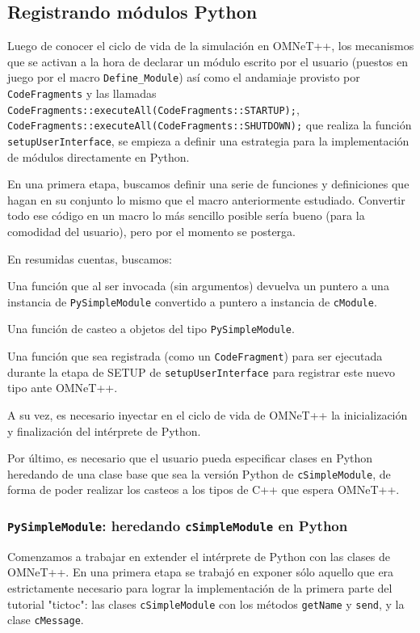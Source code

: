 \documentclass[]{article}
\begin{document}
\subsection{Registrando módulos Python}

Luego de conocer el ciclo de vida de la simulación en OMNeT++, los mecanismos
que se activan a la hora de declarar un módulo escrito por el usuario (puestos
en juego por el macro \verb!Define_Module!) así como el andamiaje provisto por
\verb!CodeFragments! y las llamadas
\verb!CodeFragments::executeAll(CodeFragments::STARTUP);!,
\verb!CodeFragments::executeAll(CodeFragments::SHUTDOWN);!  que realiza la
función \verb!setupUserInterface!, se empieza a definir una estrategia para la
implementación de módulos directamente en Python.

En una primera etapa, buscamos definir una serie de funciones y definiciones
que hagan en su conjunto lo mismo que el macro anteriormente estudiado.
Convertir todo ese código en un macro lo más sencillo posible sería bueno (para
la comodidad del usuario), pero por el momento se posterga.

En resumidas cuentas, buscamos:

Una función que al ser invocada (sin argumentos) devuelva un puntero a una
instancia de \verb!PySimpleModule! convertido a puntero a instancia de
\verb!cModule!.

Una función de casteo a objetos del tipo \verb!PySimpleModule!.

Una función que sea registrada (como un \verb!CodeFragment!) para ser ejecutada
durante la etapa de SETUP de \verb!setupUserInterface! para registrar este
nuevo tipo ante OMNeT++. 

A su vez, es necesario inyectar en el ciclo de vida de OMNeT++ la
inicialización y finalización del intérprete de Python.

Por último, es necesario que el usuario pueda especificar clases en Python
heredando de una clase base que sea la versión Python de \verb!cSimpleModule!,
de forma de poder realizar los casteos a los tipos de C++ que espera OMNeT++.

\subsubsection{\texttt{PySimpleModule}: heredando \texttt{cSimpleModule} en Python}

Comenzamos a trabajar en extender el intérprete de Python con las clases de
OMNeT++. En una primera etapa se trabajó en exponer sólo aquello que era
estrictamente necesario para lograr la implementación de la primera parte del
tutorial "tictoc": las clases \verb!cSimpleModule! con los métodos
\verb!getName! y \verb!send!, y la clase \verb!cMessage!.
\end{document}
